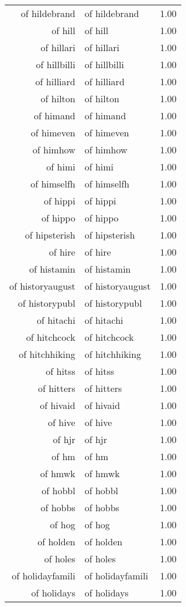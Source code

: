 \begin{table}[ht]
\begin{tabular}{rlr}
  of hildebrand & of hildebrand & 1.00 \\ 
  of hill & of hill & 1.00 \\ 
  of hillari & of hillari & 1.00 \\ 
  of hillbilli & of hillbilli & 1.00 \\ 
  of hilliard & of hilliard & 1.00 \\ 
  of hilton & of hilton & 1.00 \\ 
  of himand & of himand & 1.00 \\ 
  of himeven & of himeven & 1.00 \\ 
  of himhow & of himhow & 1.00 \\ 
  of himi & of himi & 1.00 \\ 
  of himselfh & of himselfh & 1.00 \\ 
  of hippi & of hippi & 1.00 \\ 
  of hippo & of hippo & 1.00 \\ 
  of hipsterish & of hipsterish & 1.00 \\ 
  of hire & of hire & 1.00 \\ 
  of histamin & of histamin & 1.00 \\ 
  of historyaugust & of historyaugust & 1.00 \\ 
  of historypubl & of historypubl & 1.00 \\ 
  of hitachi & of hitachi & 1.00 \\ 
  of hitchcock & of hitchcock & 1.00 \\ 
  of hitchhiking & of hitchhiking & 1.00 \\ 
  of hitss & of hitss & 1.00 \\ 
  of hitters & of hitters & 1.00 \\ 
  of hivaid & of hivaid & 1.00 \\ 
  of hive & of hive & 1.00 \\ 
  of hjr & of hjr & 1.00 \\ 
  of hm & of hm & 1.00 \\ 
  of hmwk & of hmwk & 1.00 \\ 
  of hobbl & of hobbl & 1.00 \\ 
  of hobbs & of hobbs & 1.00 \\ 
  of hog & of hog & 1.00 \\ 
  of holden & of holden & 1.00 \\ 
  of holes & of holes & 1.00 \\ 
  of holidayfamili & of holidayfamili & 1.00 \\ 
  of holidays & of holidays & 1.00 \\ 

\end{tabular}
\end{table}

